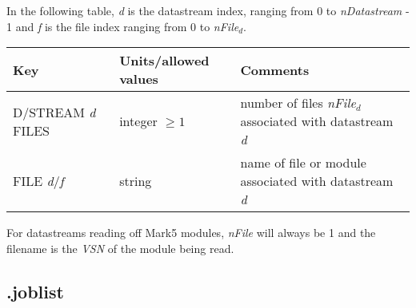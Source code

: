 In the following table, {\em d} is the datastream index, ranging from 0 to {\em nDatastream} - 1 and {\em f} is the file index ranging from 0 to {\em nFile$_\mathit{d}$}.

\begin{center}
\begin{tabular}{l l l}
\hline
Key & Units/allowed values & Comments \\
\hline
D/STREAM {\em d} FILES & integer $\ge 1$ & number of files {\em nFile$_\mathit{d}$} associated with datastream {\em d} \\
FILE {\em d}/{\em f} & string & name of file or module associated with datastream {\em d} \\
\hline
\end{tabular}
\end{center}

For datastreams reading off Mark5 modules, {\em nFile} will always be 1 and the filename is the {\em VSN} of the module being read.








\subsection{.joblist} \label{sec:joblistfile}

